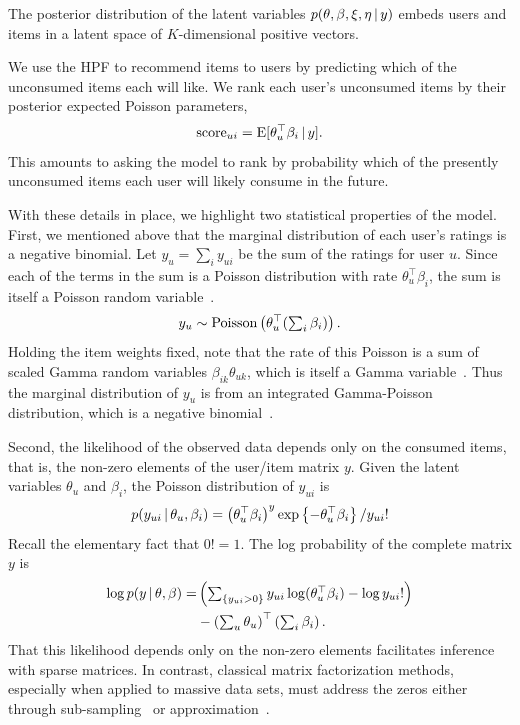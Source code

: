 \documentclass{sig-alternate}
\begin{document}
 
The posterior distribution of the latent variables $p(\theta, \beta,
\xi, \eta \,\vert\, y)$ embeds users and items in a latent space of
$K$-dimensional positive vectors. 

We use the HPF to recommend items to users by predicting which of the
unconsumed items each will like.  We rank each user's unconsumed items
by their posterior expected Poisson parameters,
\begin{equation}
  \label{eq:score}
  \textrm{score}_{ui} = \textrm{E}[\theta_u^\top \beta_i \,\vert\, y].
\end{equation}
This amounts to asking the model to rank by probability which of the
presently unconsumed items each user will likely consume in the
future.

With these details in place, we highlight two statistical properties of the
model. First, we mentioned above that the marginal distribution of
each user's ratings is a negative binomial.  Let $y_{u} = \sum_{i}
y_{ui}$ be the sum of the ratings for user $u$.  Since each of the
terms in the sum is a Poisson distribution with rate $\theta_u^\top
\beta_i$, the sum is itself a Poisson random
variable~\cite{Johnson:2005}.
\begin{equation}
  y_u \sim \textrm{Poisson}\left(\theta_u^\top (\textstyle \sum_{i} \beta_{i})\right).
\end{equation}
Holding the item weights fixed, note that the rate of this Poisson is
a sum of scaled Gamma random variables $\beta_{ik} \theta_{uk}$, which is
itself a Gamma variable~\cite{Norman:1994}.  Thus the marginal
distribution of $y_u$ is from an integrated Gamma-Poisson
distribution, which is a negative binomial~\cite{Gelman:1995}.


Second, the likelihood of the observed data depends only on the
consumed items, that is, the non-zero elements of the user/item matrix
$y$.  Given the latent variables $\theta_u$ and $\beta_i$, the Poisson
distribution of $y_{ui}$ is
\begin{equation}
  p(y_{ui} \,\vert\, \theta_u, \beta_i) =
  \left(\theta_u^\top \beta_i\right)^y
  \exp\left\{-\theta_u^\top \beta_i \right\} / y_{ui}!
\end{equation}
Recall the elementary fact that $0! = 1$.  The log probability of the
complete matrix $y$ is
\begin{align}
  \log p(y \,\vert\, \theta, \beta) =
  & \left(\textstyle \sum_{\{y_{ui} > 0\}}
    y_{ui} \log (\theta_u^\top \beta_i) - \log y_{ui}!
  \right) \\
  & -
  \left(\textstyle\sum_{u} \theta_u\right)^\top \left(\textstyle
    \sum_{i} \beta_i\right).
\end{align}
That this likelihood depends only on the non-zero elements facilitates
inference with sparse matrices.  In contrast, classical matrix
factorization methods, especially when applied to
massive data sets, must address the zeros either through
sub-sampling~\cite{Dror:2012a} or approximation~\cite{Hu:2008p9402}.
\end{document}
